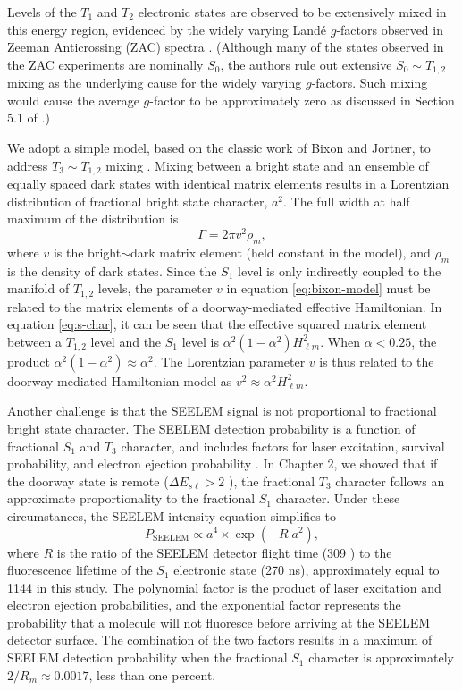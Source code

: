 \documentclass[12pt]{mitthesis}
\begin{document}
Levels of the $T_1$ and $T_2$ electronic states are observed to be
extensively mixed in this energy region, evidenced by the widely
varying Land\'{e} $g$-factors observed in Zeeman Anticrossing (ZAC)
spectra \cite{dupre95a}.  (Although many of the states observed in the
ZAC experiments are nominally $S_0$, the authors rule out extensive
$S_0 \sim T_{1,2}$ mixing as the underlying cause for the widely
varying $g$-factors.  Such mixing would cause the average $g$-factor
to be approximately zero as discussed in Section 5.1 of
\cite{dupre95a}.)

We adopt a simple model, based on the classic work of Bixon and
Jortner, to address $T_3 \sim T_{1,2}$ mixing \cite{bixon68}.  Mixing
between a bright state and an ensemble of equally spaced dark states
with identical matrix elements results in a Lorentzian distribution of
fractional bright state character, $a^2$.  The full width at half
maximum of the distribution is
\begin{equation}
  \label{eq:bixon-model}
  \Gamma = 2 \pi v^2 \rho_m,
\end{equation}
where $v$ is the bright$\sim$dark matrix element (held constant in the
model), and $\rho_m$ is the density of dark states.  Since the $S_1$
level is only indirectly coupled to the manifold of $T_{1,2}$ levels,
the parameter $v$ in equation \ref{eq:bixon-model} must be related to
the matrix elements of a doorway-mediated effective Hamiltonian.  In
equation \ref{eq:s-char}, it can be seen that the effective squared
matrix element between a $T_{1,2}$ level and the $S_1$ level is
$\alpha^2 (1 - \alpha^2) H_{\ell m}^2$.  When $\alpha < 0.25$, the
product $\alpha^2 (1 - \alpha^2) \approx \alpha^2$.  The Lorentzian
parameter $v$ is thus related to the doorway-mediated Hamiltonian
model as $v^2 \approx \alpha^2 H_{\ell m}^2$.

Another challenge is that the SEELEM signal is not proportional to
fractional bright state character.  The SEELEM detection probability
is a function of fractional $S_1$ and $T_3$ character, and includes
factors for laser excitation, survival probability, and electron
ejection probability \cite{humphrey97}.  In Chapter 2, we showed that
if the doorway state is remote ($\Delta E_{s\ell} > 2$ \rcm), the
fractional $T_3$ character follows an approximate proportionality to
the fractional $S_1$ character.  Under these circumstances, the SEELEM
intensity equation simplifies to
\begin{equation}
  \label{eq:simple-lem}
  P_{\text{SEELEM}} \propto a^4 \times \exp(-R \; a^2),
\end{equation}
where $R$ is the ratio of the SEELEM detector flight time (309
\microsec) to the fluorescence lifetime of the $S_1$ electronic state
(270 ns), approximately equal to 1144 in this study.  The polynomial
factor is the product of laser excitation and electron ejection
probabilities, and the exponential factor represents the probability
that a molecule will not fluoresce before arriving at the SEELEM
detector surface.  The combination of the two factors results in a
maximum of SEELEM detection probability when the fractional $S_1$
character is approximately $2/R_m \approx 0.0017$, less than one
percent.  
\end{document}
